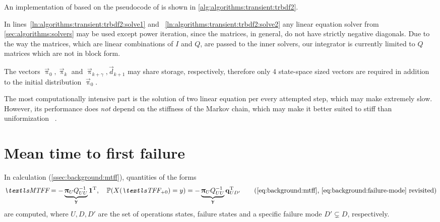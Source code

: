 
An implementation of  based on the pseudocode of
\citet{DBLP:journals/cor/ReibmanT88} is shown in
\vref{alg:algorithms:transient:trbdf2}.

In lines~\ref{ln:algorithms:transient:trbdf2:solve1} and~%
\ref{ln:algorithms:transient:trbdf2:solve2} any linear equation solver
from \vref{sec:algorithms:solvers} may be used except power iteration,
since the matrices, in general, do not have strictly negative
diagonals. Due to the way the matrices, which are linear combinations
of $I$ and $Q$, are passed to the inner solvers, our 
integrator is currently limited to $Q$ matrices which are not in block
form.

The vectors $\vec{\uppi}_0, \vec{\uppi}_k$ and
$\vec{\uppi}_{k + \gamma}, \vec{d}_{k + 1}$ may share storage,
respectively, therefore only 4 state-space sized vectors are required
in addition to the initial distribution $\vec{\uppi}_0$.

The most computationally intensive part is the solution of two linear
equation per every attempted step, which may make 
extremely slow. However, its performance does \emph{not} depend on the
stiffness of the Markov chain, which may make it better suited to stiff
 than uniformization%
~\citep{DBLP:journals/cor/ReibmanT88}.

\section{Mean time to first failure}

In  calculation (\vref{ssec:background:mtff}), quantities
of the forms
\begin{equation}
  \MTFF = - \underbrace{\vec{\uppi}_U Q_{UU}^{-1}}_{\vec{\upgamma}} \vec{1}^\T, \quad
  \Pr(X(\TFF_{+ 0}) = y) = - \underbrace{\vec{\uppi}_U Q_{UU}^{-1}}_{\vec{\upgamma}} \vec{q}_{UD'}^\T
  \tag{\ref{eq:background:mtff}, \ref{eq:background:failure-mode}
    revisited}
\end{equation}
are computed, where $U, D, D'$ are the set of operations states,
failure states and a specific failure mode $D' \subsetneq D$,
respectively.

